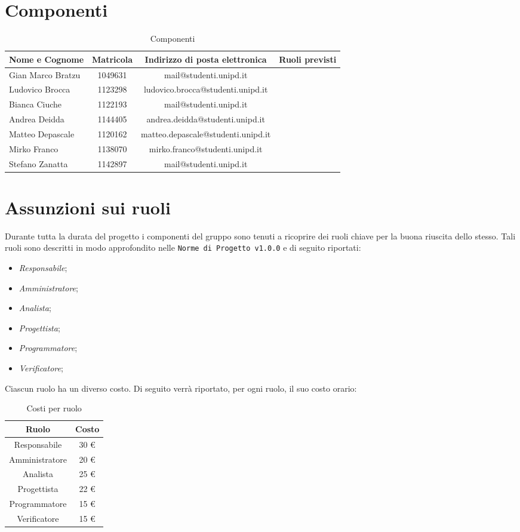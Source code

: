 \section{Componenti}
	\begin{table}[htp]
		\centering
		\caption{Componenti}
		\begin{tabularx}{\textwidth}{|X|c|c|X|}
			\hline
			\textbf{Nome e Cognome} & \textbf{Matricola} & \textbf{Indirizzo di posta elettronica} & \textbf{Ruoli previsti} \\
			\hline 
			Gian Marco Bratzu & 1049631 & mail@studenti.unipd.it & \\
			Ludovico Brocca & 1123298 & ludovico.brocca@studenti.unipd.it & \\
			Bianca Ciuche & 1122193 & mail@studenti.unipd.it & \\
			Andrea Deidda & 1144405 & andrea.deidda@studenti.unipd.it & \\
			Matteo Depascale & 1120162 & matteo.depascale@studenti.unipd.it & \\
			Mirko Franco & 1138070 &  mirko.franco@studenti.unipd.it & \\
			Stefano Zanatta & 1142897 & mail@studenti.unipd.it & \\
			\hline
		\end{tabularx}
	\end{table}
\section{Assunzioni sui ruoli}
	Durante tutta la durata del progetto i componenti del gruppo sono tenuti a ricoprire dei ruoli chiave per la buona riuscita dello stesso.
	Tali ruoli sono descritti in modo approfondito nelle \texttt{Norme di Progetto v1.0.0} e di seguito riportati:
	\begin{itemize}
		\item 	\textit{Responsabile};
		\item \textit{Amministratore};
		\item \textit{Analista};
		\item \textit{Progettista};
		\item \textit{Programmatore};
		\item \textit{Verificatore};
	\end{itemize}
	Ciascun ruolo ha un diverso costo. Di seguito verrà riportato, per ogni ruolo, il suo costo orario:
	\begin{table}[htp]
		\centering
		\caption{Costi per ruolo}
		\begin{tabular}{|c|c|}
			\hline
			\textbf{Ruolo} & \textbf{Costo} \\
			\hline
			Responsabile & 30 \euro \\
			Amministratore & 20 \euro \\
			Analista & 25 \euro \\
			Progettista & 22 \euro \\
			Programmatore & 15 \euro \\
			Verificatore & 15 \euro \\
			\hline
		\end{tabular}
	\end{table}
